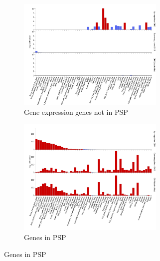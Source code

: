  \begin{figure}
  \begin{subfigure}{8cm}
    \centering\includegraphics[width=7cm]{images/FUMA_plots/gtex_v8_ts_nonPSP_FUMA_gene2func44651.png}
    \caption{Gene expression genes not in PSP}
    \end{subfigure}
  \begin{subfigure}{8cm}
    \centering\includegraphics[width=7cm]{images/FUMA_plots/gtex_v8_ts_FUMA_PSP_gtex.png}
    \caption{Genes in PSP}
  \end{subfigure}
 

\end{figure}
